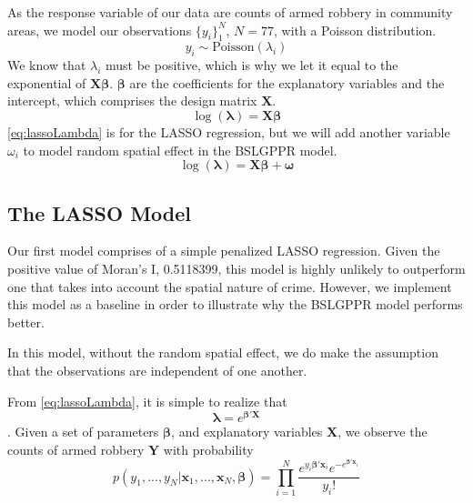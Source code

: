 \documentclass{article} %
\begin{document}
As the response variable of our data are counts of armed robbery in community areas, we model our observations $\{y_i\}_1^N$, $N = 77$, with a Poisson distribution. 
\begin{equation}
\label{eq:poislhd}
y_i \sim \text{Poisson}(\lambda_i)
\end{equation}
We know that $\lambda_i$ must be positive, which is why we let it equal to the exponential of $\mathbf{X}\boldsymbol{\beta}$. $\boldsymbol{\beta}$ are the coefficients for the explanatory variables and the intercept, which comprises the design matrix $\mathbf{X}$. 
\begin{equation}
\label{eq:lassoLambda}
\log(\boldsymbol{\lambda}) = \mathbf{X}\boldsymbol{\beta}
\end{equation}
\autoref{eq:lassoLambda} is for the LASSO regression, but we will add another variable $\omega_i$ to model random spatial effect in the BSLGPPR model. 
\begin{equation}
\label{eq:spatialLambda}
\log(\boldsymbol{\lambda}) = \mathbf{X}\boldsymbol{\beta} + \boldsymbol{\omega}
\end{equation}


\subsection{The LASSO Model}
\label{lab:LASSO}

Our first model comprises of a simple penalized LASSO regression. Given the positive value of Moran's I, 0.5118399, this model is highly unlikely to outperform one that takes into account the spatial nature of crime. However, we implement this model as a baseline in order to illustrate why the BSLGPPR model performs better.

In this model, without the random spatial effect, we do make the assumption that the observations are independent of one another. 

From \autoref{eq:lassoLambda}, it is simple to realize that 
$$ \boldsymbol{\lambda} = e^{\boldsymbol{\beta}'\mathbf{X}}$$.
Given a set of parameters $\boldsymbol{\beta}$, and explanatory variables $\mathbf{X}$, we observe the counts of armed robbery $\mathbf{Y}$ with probability
\begin{equation}
\label{eq:lhd}
p(y_1,..., y_N|\mathbf{x}_1,...,\mathbf{x}_N,\boldsymbol{\beta}) = \prod_{i=1}^{N} \frac{e^{y_i \boldsymbol{\beta}'\mathbf{x}_i}e^{-e^{\boldsymbol{\beta}'\mathbf{x}_i}}}{{y_i}!}
\end{equation}
\end{document}
